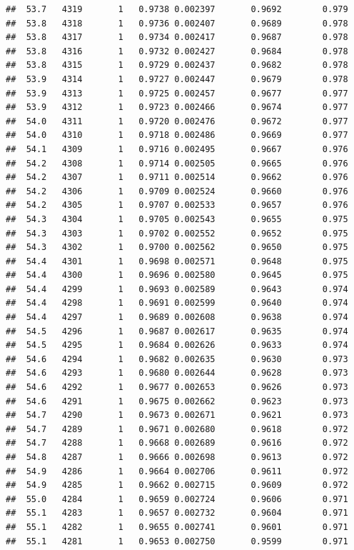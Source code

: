 \documentclass[
]{book}
\begin{document}
\begin{verbatim}
##  53.7   4319       1   0.9738 0.002397       0.9692        0.979
##  53.8   4318       1   0.9736 0.002407       0.9689        0.978
##  53.8   4317       1   0.9734 0.002417       0.9687        0.978
##  53.8   4316       1   0.9732 0.002427       0.9684        0.978
##  53.8   4315       1   0.9729 0.002437       0.9682        0.978
##  53.9   4314       1   0.9727 0.002447       0.9679        0.978
##  53.9   4313       1   0.9725 0.002457       0.9677        0.977
##  53.9   4312       1   0.9723 0.002466       0.9674        0.977
##  54.0   4311       1   0.9720 0.002476       0.9672        0.977
##  54.0   4310       1   0.9718 0.002486       0.9669        0.977
##  54.1   4309       1   0.9716 0.002495       0.9667        0.976
##  54.2   4308       1   0.9714 0.002505       0.9665        0.976
##  54.2   4307       1   0.9711 0.002514       0.9662        0.976
##  54.2   4306       1   0.9709 0.002524       0.9660        0.976
##  54.2   4305       1   0.9707 0.002533       0.9657        0.976
##  54.3   4304       1   0.9705 0.002543       0.9655        0.975
##  54.3   4303       1   0.9702 0.002552       0.9652        0.975
##  54.3   4302       1   0.9700 0.002562       0.9650        0.975
##  54.4   4301       1   0.9698 0.002571       0.9648        0.975
##  54.4   4300       1   0.9696 0.002580       0.9645        0.975
##  54.4   4299       1   0.9693 0.002589       0.9643        0.974
##  54.4   4298       1   0.9691 0.002599       0.9640        0.974
##  54.4   4297       1   0.9689 0.002608       0.9638        0.974
##  54.5   4296       1   0.9687 0.002617       0.9635        0.974
##  54.5   4295       1   0.9684 0.002626       0.9633        0.974
##  54.6   4294       1   0.9682 0.002635       0.9630        0.973
##  54.6   4293       1   0.9680 0.002644       0.9628        0.973
##  54.6   4292       1   0.9677 0.002653       0.9626        0.973
##  54.6   4291       1   0.9675 0.002662       0.9623        0.973
##  54.7   4290       1   0.9673 0.002671       0.9621        0.973
##  54.7   4289       1   0.9671 0.002680       0.9618        0.972
##  54.7   4288       1   0.9668 0.002689       0.9616        0.972
##  54.8   4287       1   0.9666 0.002698       0.9613        0.972
##  54.9   4286       1   0.9664 0.002706       0.9611        0.972
##  54.9   4285       1   0.9662 0.002715       0.9609        0.972
##  55.0   4284       1   0.9659 0.002724       0.9606        0.971
##  55.1   4283       1   0.9657 0.002732       0.9604        0.971
##  55.1   4282       1   0.9655 0.002741       0.9601        0.971
##  55.1   4281       1   0.9653 0.002750       0.9599        0.971

\end{verbatim}
\end{document}
